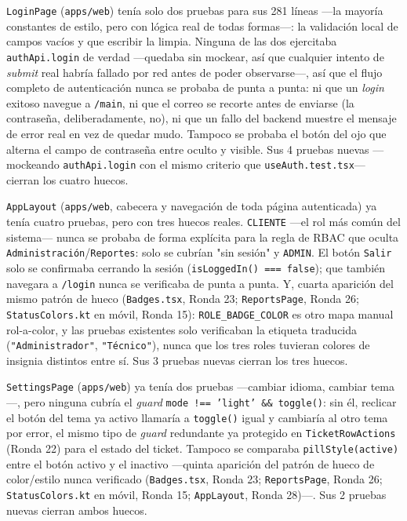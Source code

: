 \texttt{LoginPage} (\texttt{apps/web}) tenía solo dos pruebas para sus 281 líneas —la mayoría
constantes de estilo, pero con lógica real de todas formas—: la validación local de campos
vacíos y que escribir la limpia. Ninguna de las dos ejercitaba \texttt{authApi.login} de verdad
—quedaba sin mockear, así que cualquier intento de \emph{submit} real habría fallado por red
antes de poder observarse—, así que el flujo completo de autenticación nunca se probaba de
punta a punta: ni que un \emph{login} exitoso navegue a \texttt{/main}, ni que el correo se
recorte antes de enviarse (la contraseña, deliberadamente, no), ni que un fallo del backend
muestre el mensaje de error real en vez de quedar mudo. Tampoco se probaba el botón del ojo que
alterna el campo de contraseña entre oculto y visible. Sus 4 pruebas nuevas —mockeando
\texttt{authApi.login} con el mismo criterio que \texttt{useAuth.test.tsx}— cierran los cuatro
huecos.

\texttt{AppLayout} (\texttt{apps/web}, cabecera y navegación de toda página autenticada) ya
tenía cuatro pruebas, pero con tres huecos reales. \texttt{CLIENTE} —el rol más común del
sistema— nunca se probaba de forma explícita para la regla de RBAC que oculta
\texttt{Administración}/\texttt{Reportes}: solo se cubrían "sin sesión" y \texttt{ADMIN}. El
botón \texttt{Salir} solo se confirmaba cerrando la sesión (\texttt{isLoggedIn() === false});
que también navegara a \texttt{/login} nunca se verificaba de punta a punta. Y, cuarta aparición
del mismo patrón de hueco (\texttt{Badges.tsx}, Ronda 23; \texttt{ReportsPage}, Ronda 26;
\texttt{StatusColors.kt} en móvil, Ronda 15): \texttt{ROLE\_BADGE\_COLOR} es otro mapa manual
rol-a-color, y las pruebas existentes solo verificaban la etiqueta traducida
(\texttt{"Administrador"}, \texttt{"Técnico"}), nunca que los tres roles tuvieran colores de
insignia distintos entre sí. Sus 3 pruebas nuevas cierran los tres huecos.

\texttt{SettingsPage} (\texttt{apps/web}) ya tenía dos pruebas —cambiar idioma, cambiar
tema—, pero ninguna cubría el \emph{guard} \texttt{mode !== 'light' \&\& toggle()}: sin él,
reclicar el botón del tema ya activo llamaría a \texttt{toggle()} igual y cambiaría al otro
tema por error, el mismo tipo de \emph{guard} redundante ya protegido en
\texttt{TicketRowActions} (Ronda 22) para el estado del ticket. Tampoco se comparaba
\texttt{pillStyle(active)} entre el botón activo y el inactivo —quinta aparición del patrón de
hueco de color/estilo nunca verificado (\texttt{Badges.tsx}, Ronda 23; \texttt{ReportsPage},
Ronda 26; \texttt{StatusColors.kt} en móvil, Ronda 15; \texttt{AppLayout}, Ronda 28)—. Sus 2
pruebas nuevas cierran ambos huecos.

